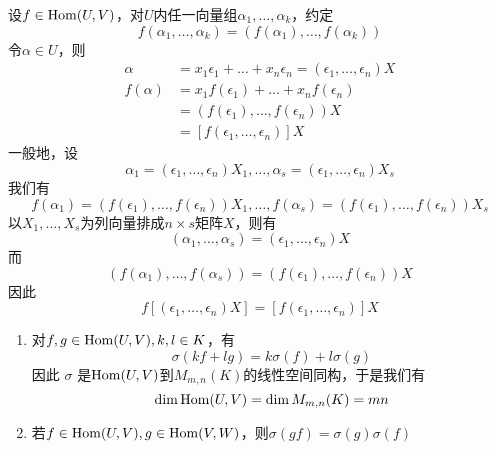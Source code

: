 \documentclass[11pt]{article}
\begin{document}
设\(f\in\operatorname{Hom}(U,V)\)，对\(U\)内任一向量组\(\alpha_1,\dots,\alpha_k\)，约定
\begin{equation*}
f(\alpha_1,\dots,\alpha_k)=(f(\alpha_1),\dots,f(\alpha_k))
\end{equation*}
令\(\alpha\in U\)，则
\begin{align*}
\alpha&=x_1\epsilon_1+\dots+x_n\epsilon_n=(\epsilon_1,\dots,\epsilon_n)X\\
f(\alpha)   &=x_1f(\epsilon_1)+\dots+x_nf(\epsilon_n)\\
&=(f(\epsilon_1),\dots,f(\epsilon_n))X\\
&=[f(\epsilon_1,\dots,\epsilon_n)]X
\end{align*}
一般地，设
\begin{equation*}
\alpha_1=(\epsilon_1,\dots,\epsilon_n)X_1,\dots,\alpha_s=
(\epsilon_1,\dots,\epsilon_n)X_s
\end{equation*}
我们有
\begin{equation*}
f(\alpha_1)=(f(\epsilon_1),\dots,f(\epsilon_n))X_1,\dots,
f(\alpha_s)=(f(\epsilon_1),\dots,f(\epsilon_n))X_s
\end{equation*}
以\(X_1,\dots,X_s\)为列向量排成\(n\times s\)矩阵\(X\)，则有
\begin{equation*}
(\alpha_1,\dots,\alpha_s)=(\epsilon_1,\dots,\epsilon_n)X
\end{equation*}
而
\begin{equation*}
(f(\alpha_1),\dots,f(\alpha_s))=(f(\epsilon_1),\dots,f(\epsilon_n))X
\end{equation*}
因此
\begin{equation*}
f[(\epsilon_1,\dots,\epsilon_n)X]=[f(\epsilon_1,\dots,\epsilon_n)]X
\end{equation*}

\begin{proposition}[]
\label{prop4.3.7}
\begin{enumerate}
\item 对\(f,g\in\operatorname{Hom}(U,V),k,l\in K\)，有
\begin{equation*}
\sigma(kf+lg)=k\sigma(f)+l\sigma(g)
\end{equation*}
因此 \(\sigma\) 是\(\operatorname{Hom}(U,V)\)到\(M_{m,n}(K)\)的线性空间同构，于是我们有
\begin{equation*}
\dim\operatorname{Hom}(U,V)=\dim M_{m,n}(K)=mn
\end{equation*}
\item 若\(f\in\operatorname{Hom}(U,V),g\in\operatorname{Hom}(V,W)\)，则\(\sigma(gf)=\sigma(g)\sigma(f)\)
\end{enumerate}
\end{proposition}
\end{document}
